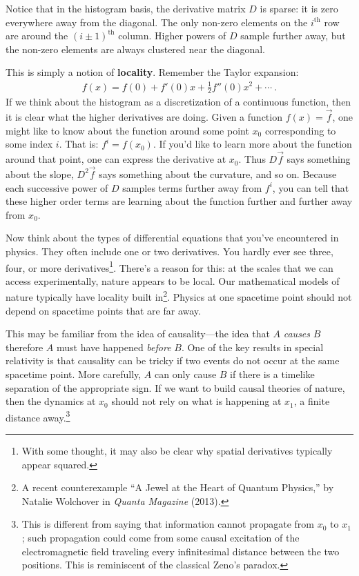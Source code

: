 \documentclass[
  11pt,
	colorful,
	raggedright,
]{tufte-style-thesis-flip}
\begin{document}
Notice that in the histogram basis, the derivative matrix $D$ is sparse: it is zero everywhere away from the diagonal. The only non-zero elements on the $i^\text{th}$ row are around the $(i\pm 1)^\text{th}$ column.  Higher powers of $D$ sample further away, but the non-zero elements are always clustered near the diagonal.

This is simply a notion of \textbf{locality}. Remember the Taylor expansion:
\begin{align}
  f(x) = f(0) + f'(0) x + \frac{1}{2} f''(0)x^2 + \cdots \ .
\end{align}
If we think about the histogram as a discretization of a continuous function, then it is clear what the higher derivatives are doing. Given a function $f(x) = \vec{f}$, one might like to know about the function around some point $x_0$ corresponding to some index $i$. That is: $f^i = f(x_0)$. If you’d like to learn more about the function around that point, one can express the derivative at $x_0$. Thus $D\vec{f}$ says something about the slope, $D^2\vec{f}$ says something about the curvature, and so on. Because each successive power of $D$ samples terms further away from $f^i$, you can tell that these higher order terms are learning about the function further and further away from $x_0$. 

Now think about the types of differential equations that you’ve encountered in physics. They often include one or two derivatives. You hardly ever see three, four, or more derivatives\footnote{With some thought, it may also be clear why spatial derivatives typically appear squared.}. There’s a reason for this: at the scales that we can access experimentally, nature appears to be local. Our mathematical models of nature typically have locality built in\footnote{A recent counterexample ``A Jewel at the Heart of Quantum Physics,'' by Natalie Wolchover in \emph{Quanta Magazine} (2013).
}. Physics at one spacetime point should not depend on spacetime points that are far away. 

This may be familiar from the idea of causality---the idea that $A$ \emph{causes} $B$ therefore $A$ must have happened \emph{before} $B$. One of the key results in special relativity is that causality can be tricky if two events do not occur at the same spacetime point. More carefully, $A$ can only cause $B$ if there is a timelike separation of the appropriate sign.  If we want to build causal theories of nature, then the dynamics at $x_0$ should not rely on what is happening at $x_1$, a finite distance away.\footnote{This is different from saying that information cannot propagate from $x_0$ to $x_1$; such propagation could come from some causal excitation of the electromagnetic field traveling every infinitesimal distance between the two positions. This is reminiscent of the classical Zeno's paradox.}
\end{document}
